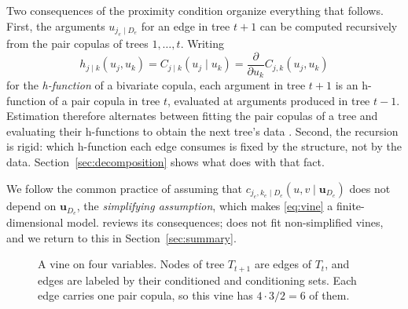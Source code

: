 \documentclass[article]{jss}
\newcommand{\bu}{\bm{u}}
\begin{document}
Two consequences of the proximity condition organize everything that follows.
First, the arguments $u_{j_e \mid D_e}$ for an edge in tree $t+1$ can be
computed recursively from the pair copulas of trees $1, \dots, t$.  Writing
\begin{equation}\label{eq:hfunc}
  h_{j \mid k}(u_j, u_k)
    = C_{j \mid k}(u_j \mid u_k)
    = \frac{\partial}{\partial u_k} C_{j,k}(u_j, u_k)
\end{equation}
for the \emph{h-function} of a bivariate copula, each argument in tree $t+1$ is an
h-function of a pair copula in tree $t$, evaluated at arguments produced in
tree $t-1$.  Estimation therefore alternates between fitting the pair copulas
of a tree and evaluating their h-functions to obtain the next tree's data
\citep{aas2009}.  Second, the recursion is rigid: which h-function each edge
consumes is fixed by the structure, not by the data.
Section~\ref{sec:decomposition} shows what  does with that
fact.

We follow the common practice of assuming that
$c_{j_e, k_e \mid D_e}(u, v \mid \bu_{D_e})$ does not depend on $\bu_{D_e}$,
the \emph{simplifying assumption}, which makes \eqref{eq:vine} a
finite-dimensional model.  \citet{nagler2025} reviews its consequences;
 does not fit non-simplified vines, and we return to this in
Section~\ref{sec:summary}.

\begin{figure}[t!]
  \centering
  \caption{A vine on four variables.  Nodes of tree $T_{t+1}$ are edges of
  $T_t$, and edges are labeled by their conditioned and conditioning sets.
  Each edge carries one pair copula, so this vine has
  $4 \cdot 3 / 2 = 6$ of them.}
  \label{fig:vine}
\end{figure}
\end{document}
